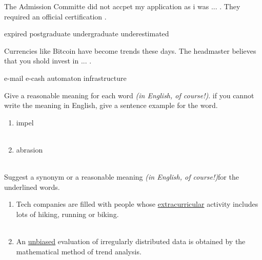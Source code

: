 \documentclass{exam}
\begin{document}
\begin{questions}
\question The Admission Committe did not accpet my application as i was ... . They required an official certification . \\
\begin{oneparchoices}
\choice expired
\choice postgraduate
\correctchoice undergraduate
\choice underestimated
\end{oneparchoices}



\question Currencies like Bitcoin have become trends these days. The headmaster believes that you shold invest in ... .\\
\begin{oneparchoices}
\choice e-mail
\correctchoice e-cash
\choice automaton
\choice infrastructure

\end{oneparchoices}
\question Give a reasonable meaning for each word \emph{(in English, of course!)}. if you cannot write the meaning in English, give a sentence example for the word.\\
\begin{enumerate}
	\item impel \\ \\
	\item abrasion \\ \\
\end{enumerate}
\question Suggest a synonym or a reasonable meaning \emph{(in English, of course!)}for the underlined words.\\
\begin{enumerate}
	\item Tech companies are filled with people whose \underline{extracurricular} activity includes lots of hiking, running or biking.\\ \\
	\item An \underline{unbiased} evaluation of irregularly distributed data is obtained by the mathematical method of trend analysis.\\ \\
\end{enumerate}

\end{questions}
\end{document}
